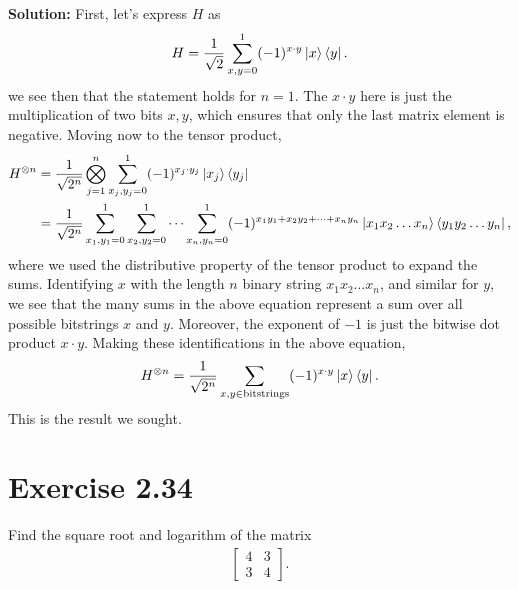 \documentclass{book}
\begin{document}
    \textbf{Solution:} First, let's express $H$ as
    \begin{align}
        H = \frac{1}{\sqrt{2}}\sum_{x,y = 0}^1 (-1)^{x\cdot y} \ket{x}\bra{y}.
    \end{align}
    we see then that the statement holds for $n = 1$. The $x\cdot y$ here is just the multiplication of two bits $x, y$, which ensures that only the last matrix element is negative. Moving now to the tensor product,
    \begin{align}
        H^{\otimes n} &= \frac{1}{\sqrt{2^n}} \bigotimes_{j = 1}^n \sum_{x_j, y_j = 0}^1 (-1)^{x_j\cdot y_j} \ket{x_j}\bra{y_j} \\
        &= \frac{1}{\sqrt{2^n}} \sum_{x_1, y_1 = 0}^1 \sum_{x_2, y_2 = 0}^1 \dots \sum_{x_n, y_n = 0}^1 (-1)^{x_1 y_1 + x_2 y_2 + \dots + x_n y_n} \ket{x_1 x_2 \dots x_n} \bra{y_1 y_2 \dots y_n},
    \end{align}
    where we used the distributive property of the tensor product to expand the sums. Identifying $x$ with the length $n$ binary string $x_1 x_2 \dots x_n$, and similar for $y$, we see that the many sums in the above equation represent a sum over all possible bitstrings $x$ and $y$. Moreover, the exponent of $-1$ is just the bitwise dot product $x\cdot y$. Making these identifications in the above equation,
    \begin{align}
        H^{\otimes n} = \frac{1}{\sqrt{2^n}} \sum_{x,y \in \text{bitstrings}} (-1)^{x\cdot y} \ket{x}\bra{y}.
    \end{align}
    This is the result we sought. 
    
\section*{Exercise 2.34}
    Find the square root and logarithm of the matrix
    \begin{align}
    \begin{bmatrix}
        4 & 3 \\
        3 & 4
    \end{bmatrix}.
    \end{align}
    
\end{document}
